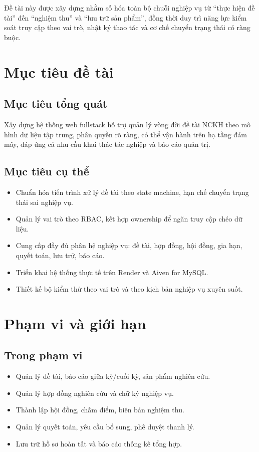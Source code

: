 \documentclass[12pt,a4paper]{report}
\begin{document}
Đề tài này được xây dựng nhằm số hóa toàn bộ chuỗi nghiệp vụ từ ``thực hiện đề tài'' đến ``nghiệm thu'' và ``lưu trữ sản phẩm'', đồng thời duy trì năng lực kiểm soát truy cập theo vai trò, nhật ký thao tác và cơ chế chuyển trạng thái có ràng buộc.

\section{Mục tiêu đề tài}
\subsection{Mục tiêu tổng quát}
Xây dựng hệ thống web fullstack hỗ trợ quản lý vòng đời đề tài NCKH theo mô hình dữ liệu tập trung, phân quyền rõ ràng, có thể vận hành trên hạ tầng đám mây, đáp ứng cả nhu cầu khai thác tác nghiệp và báo cáo quản trị.

\subsection{Mục tiêu cụ thể}
\begin{itemize}[leftmargin=1.2cm]
\item Chuẩn hóa tiến trình xử lý đề tài theo state machine, hạn chế chuyển trạng thái sai nghiệp vụ.
\item Quản lý vai trò theo RBAC, kết hợp ownership để ngăn truy cập chéo dữ liệu.
\item Cung cấp đầy đủ phân hệ nghiệp vụ: đề tài, hợp đồng, hội đồng, gia hạn, quyết toán, lưu trữ, báo cáo.
\item Triển khai hệ thống thực tế trên Render và Aiven for MySQL.
\item Thiết kế bộ kiểm thử theo vai trò và theo kịch bản nghiệp vụ xuyên suốt.
\end{itemize}

\section{Phạm vi và giới hạn}
\subsection{Trong phạm vi}
\begin{itemize}[leftmargin=1.2cm]
\item Quản lý đề tài, báo cáo giữa kỳ/cuối kỳ, sản phẩm nghiên cứu.
\item Quản lý hợp đồng nghiên cứu và chữ ký nghiệp vụ.
\item Thành lập hội đồng, chấm điểm, biên bản nghiệm thu.
\item Quản lý quyết toán, yêu cầu bổ sung, phê duyệt thanh lý.
\item Lưu trữ hồ sơ hoàn tất và báo cáo thống kê tổng hợp.
\end{itemize}
\end{document}
